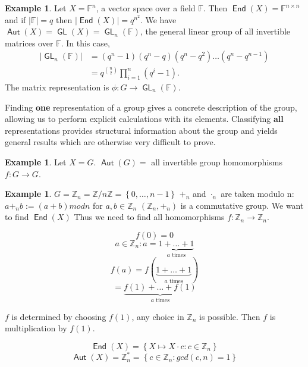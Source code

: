 \documentclass[12pt]{amsart}
\theoremstyle{definition}
\newtheorem{example}[theorem]{Example}
\DeclareMathOperator{\Aut}{\mathsf{Aut}}
\DeclareMathOperator{\End}{\mathsf{End}}
\DeclareMathOperator{\GL}{\mathsf{GL}}
\newcommand{\Size}[1]{\left| #1 \right|}
\begin{document}
\begin{example}
Let $X=\mathbb{F}^n$, a vector space over a field $\mathbb{F}$.  Then $\End(X)=\mathbb{F}^{n\times n}$ and if $\Size{\mathbb{F}}=q$ then $\Size{\End(X)}=q^{n^2}$.  We have $\Aut(X)=\GL(X)=\GL_n(\mathbb{F})$, the general linear group of all invertible matrices over $\mathbb{F}$.  In this case,
\begin{align*}
\Size{\GL_n(\mathbb{F})} &= (q^n-1)(q^n-q)(q^n-q^2)\ldots(q^n-q^{n-1})\\
&= q^{n\choose 2}\prod_{i=1}^n(q^i-1).
\end{align*}
The matrix representation is $\phi:G\rightarrow \GL_n(\mathbb{F})$.
\end{example}

Finding \textbf{one} representation of a group gives a concrete description of the group, allowing us to perform explicit calculations with its elements.  Classifying \textbf{all} representations provides structural information about the group and yields general results which are otherwise very difficult to prove.

\begin{example}
Let $X = G$. $\Aut(G) =$ all invertible group homomorphisms $f: G \rightarrow G$.
\end{example}

\begin{example}
$G = \mathbb{Z}_{n} = \mathbb{Z} / n \mathbb{Z} = \left\{ 0, \ldots , n - 1 \right\}$
$+_{n}$ and $\cdot_{n}$ are taken modulo n:
$a +_{n} b := ( a + b ) mod n$ for $a, b \in \mathbb{Z}_{n}$
$\left( \mathbb{Z}_{n}, +_{n} \right)$ is a commutative group. We want to find
$\End(X)$
Thus we need to find all homomorphisms $f: \mathbb{Z}_{n} \rightarrow \mathbb{Z}_{n}$.


$$f(0) = 0$$
$$a \in \mathbb{Z}_{n} : a = \underbrace{1 + \ldots + 1}_{a \text{ times}}$$
$$f(a) = f( \underbrace{1 + \ldots + 1}_{a \text{ times}})$$
$$ = \underbrace{f(1) + \ldots + f(1)}_{a \text{ times}}$$

$f$ is determined by choosing $f(1)$, any choice in $\mathbb{Z}_{n}$ is possible. Then $f$ is multiplication by $f(1)$.

$$\End(X) = \left\{ X \mapsto X \cdot c : c \in \mathbb{Z}_{n} \right\}$$
$$\Aut(X) = \mathbb{Z}_{n}^{\ast} = \left\{ c \in \mathbb{Z}_{n} : gcd ( c, n ) = 1 \right\}$$
\end{example}
\end{document}
